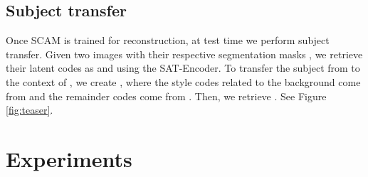 \documentclass[runningheads]{llncs}
\makeatletter
\newcommand{\mname}{SCAM\@\xspace}
\newcommand{\nicolas}[1]{\textcolor{blue}{[#1]}}
\makeatother
\begin{document}
\begin{comment}

We train \mname with a combination of GAN and reconstruction losses. Here, we denote by D the discriminator, G the generator and E the Encoder.

\noindent \textbf{For the discriminator,} we following Pix2Pix \cite{isola2018imagetoimage}, Pix2PixHD~\cite{wang2018pix2pixHD}, SPADE\cite{park2019semantic} and SEAN~\cite{Zhu_2020} and use PatchGAN, as it discriminates for patches of the given image instead of discriminating the global image. 
This allows the GAN objective to focus on the high-frequency content, leaving the low-frequency content for the reconstruction loss. 

\noindent For the\textbf{ GAN loss}, we use Hinge GAN loss~\cite{lim2017geometric} as follows: 


\noindent For the \textbf{reconstruction loss}, we use the perceptual loss as in~\cite{Zhu_2020}. This uses a pretrained VGG network, and tries to make the intermediate feature maps between the input and the reconstructed input as close as possible. It is defined as:

\noindent with  the number of VGG hidden layers and  the  layer feature map of the VGG feature map.

\noindent \textbf{The final loss} for the generator and the discriminator is:

\noindent with  and  hyperparameters. \nicolas{Losses details in the supplementary}. In our experiments, we use , as  smaller values may lead to training collapse.
\end{comment}


\subsection{Subject transfer}
Once \mname is trained for reconstruction, at test time we perform subject transfer. 
Given two images  with their respective segmentation masks , we retrieve their latent codes as  and  using the SAT-Encoder. To transfer the subject from  to the context of , we create , where the style codes related to the background come from  and the remainder codes come from . Then, we retrieve . See Figure \ref{fig:teaser}.



 
\section{Experiments}
\label{sec:experiments}
\end{document}
